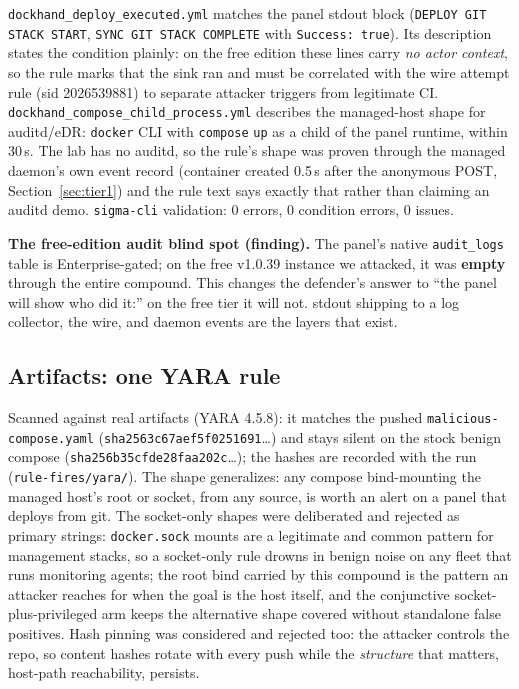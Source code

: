 \documentclass[journal]{IEEEtran}
\begin{document}
\texttt{dockhand\_deploy\_executed.yml} matches the panel stdout block
(\texttt{DEPLOY GIT STACK START}, \texttt{SYNC GIT STACK COMPLETE} with
\texttt{Success: true}). Its description states the condition plainly: on the free edition these lines carry \emph{no actor
context}, so the rule marks that the sink ran and must be correlated with the
wire attempt rule (sid 2026539881) to separate attacker triggers from
legitimate CI. \texttt{dockhand\_compose\_}\allowbreak\texttt{child\_process.yml}
describes the managed-host shape for auditd/eDR: \texttt{docker} CLI with
\texttt{compose} \texttt{up} as a child of the panel runtime, within 30\,s.
The lab has no auditd, so the rule's shape was proven through the managed
daemon's own event record (container created 0.5\,s after the anonymous POST,
Section~\ref{sec:tier1}) and the rule text says exactly that rather than
claiming an auditd demo. \texttt{sigma-cli} validation: 0 errors, 0 condition
errors, 0 issues.

\textbf{The free-edition audit blind spot (finding).} The panel's native
\texttt{audit\_logs} table is Enterprise-gated; on the free v1.0.39 instance
we attacked, it was \textbf{empty} through the entire compound. This changes
the defender's answer to ``the panel will show who did it:'' on the free tier
it will not. stdout shipping to a log collector, the wire, and daemon events
are the layers that exist.

\subsection{Artifacts: one YARA rule}
\label{sec:yara}

Scanned against real artifacts (YARA 4.5.8): it matches the pushed
\texttt{malicious-compose.yaml} (\texttt{sha256}\allowbreak\texttt{3c67aef5f0251691}\ldots)
and stays silent on the stock benign compose
(\texttt{sha256}\allowbreak\texttt{b35cfde28faa202c}\ldots); the hashes are
recorded with the run (\texttt{rule-fires/yara/}). The shape generalizes: any
compose bind-mounting the managed host's root or socket, from any source, is
worth an alert on a panel that deploys from git. The socket-only shapes were
deliberated and rejected as primary strings: \texttt{docker.sock} mounts are a
legitimate and common pattern for management stacks, so a socket-only rule
drowns in benign noise on any fleet that runs monitoring agents; the root bind
carried by this compound is the pattern an attacker reaches for when the goal
is the host itself, and the conjunctive socket-plus-privileged arm keeps the
alternative shape covered without standalone false positives. Hash pinning was
considered and rejected too: the attacker controls the repo, so content hashes
rotate with every push while the \emph{structure} that matters, host-path
reachability, persists.
\end{document}
